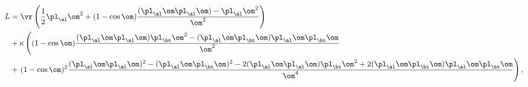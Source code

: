 \begin{equation}                                        \label{eacomi}
\begin{split}
  L&=\vr\left(\frac12\pl_\al\om^2
  +(1-\cos\om)\frac{(\pl_\al\om\pl_\al\om)-\pl_\al\om^2}{\om^2}\right)
\\
  &+\kappa\left((1-\cos\om)\frac{(\pl_\al\om\pl_\al\om)\pl_\bt\om^2
  -(\pl_\al\om\pl_\bt\om)\pl_\al\om\pl_\bt\om}{\om^2}\right.
\\
  &+\left.(1-\cos\om)^2\frac{(\pl_\al\om\pl_\al\om)^2
  -(\pl_\al\om\pl_\bt\om)^2
  -2(\pl_\al\om\pl_\al\om)\pl_\bt\om^2
  +2(\pl_\al\om\pl_\bt\om)\pl_\al\om\pl_\bt\om}{\om^4}\right),
\end{split}
\end{equation}

